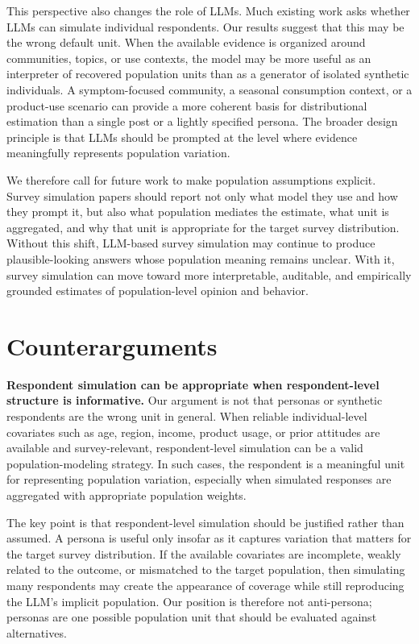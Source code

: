 \documentclass{article}
\begin{document}
This perspective also changes the role of LLMs.
Much existing work asks whether LLMs can simulate individual respondents.
Our results suggest that this may be the wrong default unit.
When the available evidence is organized around communities, topics, or use contexts, the model may be more useful as an interpreter of recovered population units than as a generator of isolated synthetic individuals.
A symptom-focused community, a seasonal consumption context, or a product-use scenario can provide a more coherent basis for distributional estimation than a single post or a lightly specified persona.
The broader design principle is that LLMs should be prompted at the level where evidence meaningfully represents population variation.

We therefore call for future work to make population assumptions explicit.
Survey simulation papers should report not only what model they use and how they prompt it, but also what population mediates the estimate, what unit is aggregated, and why that unit is appropriate for the target survey distribution.
Without this shift, LLM-based survey simulation may continue to produce plausible-looking answers whose population meaning remains unclear.
With it, survey simulation can move toward more interpretable, auditable, and empirically grounded estimates of population-level opinion and behavior.

\section{Counterarguments}
\label{sec:counterarguments}

\textbf{Respondent simulation can be appropriate when respondent-level structure is informative.}
Our argument is not that personas or synthetic respondents are the wrong unit in general.
When reliable individual-level covariates such as age, region, income, product usage, or
prior attitudes are available and survey-relevant, respondent-level simulation can be a
valid population-modeling strategy. In such cases, the respondent is a meaningful unit
for representing population variation, especially when simulated responses are aggregated with appropriate population weights.

The key point is that respondent-level simulation should be justified rather than
assumed. A persona is useful only insofar as it captures variation that matters for the
target survey distribution. If the available covariates are incomplete, weakly related to
the outcome, or mismatched to the target population, then simulating many respondents may
create the appearance of coverage while still reproducing the LLM's implicit population.
Our position is therefore not anti-persona; personas are one possible population unit
that should be evaluated against alternatives.
\end{document}
